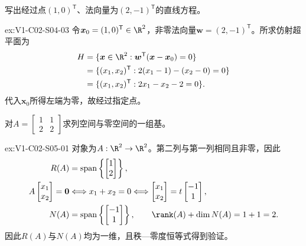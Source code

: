 \begin{SLChapterExercisePairSection}
\begin{exercise}[超平面]\label{ex:V1-C02-S04-03}
写出经过点$(1,0)^{\mathsf T}$、法向量为$(2,-1)^{\mathsf T}$的直线方程。
\end{exercise}
\label{sol:V1-C02-S04-03}
\begin{chapterexercisesolution}{ex:V1-C02-S04-03}
令$\boldsymbol{x}_0=(1,0)^{\mathsf T}\in\R^2$，非零法向量$\boldsymbol w=(2,-1)^{\mathsf T}$。所求仿射超平面为
\[
\begin{aligned}
H&=\{\boldsymbol{x}\in\R^2:
\boldsymbol w^{\mathsf T}(\boldsymbol{x}-\boldsymbol{x}_0)=0\}\\
&=\{(x_1,x_2)^{\mathsf T}:2(x_1-1)-(x_2-0)=0\}\\
&=\{(x_1,x_2)^{\mathsf T}:2x_1-x_2-2=0\}.
\end{aligned}
\]
代入$\boldsymbol{x}_0$所得左端为零，故经过指定点。
\end{chapterexercisesolution}

\begin{exercise}[基本子空间]\label{ex:V1-C02-S05-01}
对$A=\begin{bmatrix}1&1\\2&2\end{bmatrix}$求列空间与零空间的一组基。
\end{exercise}
\label{sol:V1-C02-S05-01}
\begin{chapterexercisesolution}{ex:V1-C02-S05-01}
对象为$A:\R^2\to\R^2$。第二列与第一列相同且非零，因此
\[
\begin{aligned}
R(A)&=\operatorname{span}\left\{\begin{bmatrix}1\\2\end{bmatrix}\right\},\\
A\begin{bmatrix}x_1\\x_2\end{bmatrix}=\boldsymbol0
&\Longleftrightarrow x_1+x_2=0
\Longleftrightarrow
\begin{bmatrix}x_1\\x_2\end{bmatrix}
=t\begin{bmatrix}-1\\1\end{bmatrix},\\
N(A)&=\operatorname{span}\left\{\begin{bmatrix}-1\\1\end{bmatrix}\right\},
\qquad \rank(A)+\dim N(A)=1+1=2.
\end{aligned}
\]
因此$R(A)$与$N(A)$均为一维，且秩—零度恒等式得到验证。
\end{chapterexercisesolution}


\end{SLChapterExercisePairSection}
